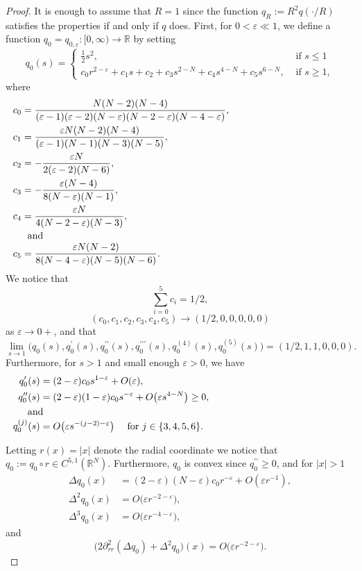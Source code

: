 \documentclass[a4paper,two-side,10pt]{amsart}
\newcommand{\R}{\mathbb{R}}
\numberwithin{equation}{section}
\begin{document}
\begin{proof}
It is enough to assume that $R=1$ since the function $q_R:=R^2 q(\cdot/R)$ satisfies the properties if and only if $q$ does.
First, for $0<\varepsilon\ll 1$, we define a function $q_0=q_{0,\varepsilon}\colon [0,\infty)\to\R$ by setting
\[
q_0(s)=
\begin{cases}
\frac{1}{2}s^2, &\text{ if }s\le 1\\
c_0r^{2-\varepsilon}+c_1s + c_2+c_3s^{2-N} +c_4s^{4-N}+c_5s^{6-N}, &\text{ if }s\ge 1,
\end{cases}
\]
where
\begin{align*}
c_0&=\frac{N(N-2)(N-4)}{(\varepsilon-1)(\varepsilon-2)(N-\varepsilon)(N-2-\varepsilon)(N-4-\varepsilon)},\\
c_1&=\frac{\varepsilon N(N-2)(N-4)}{(\varepsilon-1)(N-1)(N-3)(N-5)},\\
c_2&=-\frac{\varepsilon N}{2(\varepsilon-2)(N-6)},\\
c_3&=-\frac{\varepsilon (N-4)}{8(N-\varepsilon)(N-1)},\\
c_4&=\frac{\varepsilon N}{4(N-2-\varepsilon)(N-3)},\\
\noalign{and}
c_5&=\frac{\varepsilon N(N-2)}{8(N-4-\varepsilon)(N-5)(N-6)}.
\end{align*}
We notice that \[
\sum_{i=0}^5 c_i=1/2,
\]  
\[
(c_0,c_1,c_2,c_3,c_4,c_5)\to (1/2,0,0,0,0,0)
\] 
as $\varepsilon\to 0+$, 
and that
\[
\lim_{s\to 1}\big(q_0(s),q^\prime_0(s),q^{\prime\prime}_0(s),q^{\prime\prime\prime}_0(s),q^{(4)}_0(s),q^{(5)}_0(s)\big)=(1/2,1,1,0,0,0).
\]
Furthermore, for $s>1$ and small enough $\varepsilon>0$, we have
\begin{align*}
q^\prime_0(s)&=(2-\varepsilon)c_0 s^{1-\varepsilon}+O(\varepsilon),\\
q^{\prime\prime}_0(s)&=(2-\varepsilon)(1-\varepsilon)c_0s^{-\varepsilon}+O\big(\varepsilon s^{4-N}\big)\ge 0,\\
\noalign{and}
q^{(j)}_0(s)&=O\big(\varepsilon s^{-(j-2)-\varepsilon}\big)\quad \text{ for }j\in\{3,4,5,6\}.
\end{align*}

Letting $r(x)=|x|$ denote the radial coordinate we notice that
$q_0:=q_0\circ r\in C^{5,1}(\R^N)$.
Furthermore, $q_0$ is convex since $q^{\prime\prime}_0\ge 0$, and for $|x|>1$
\begin{align*}
\Delta q_0(x)&=(2-\varepsilon)(N-\varepsilon)c_0r^{-\varepsilon} +O(\varepsilon r^{-1}),\\
\Delta^2 q_0(x)&= O\big(\varepsilon r^{-2-\varepsilon}\big),\\
\Delta^3 q_0(x)&=O\big(\varepsilon r^{-4-\varepsilon}\big),
\end{align*}
and
\[
\big(2\partial_{rr}^2(\Delta q_0)+\Delta^2 q_0\big)(x)=O\big(\varepsilon r^{-2-\varepsilon}\big).
\]



\end{proof}
\end{document}
